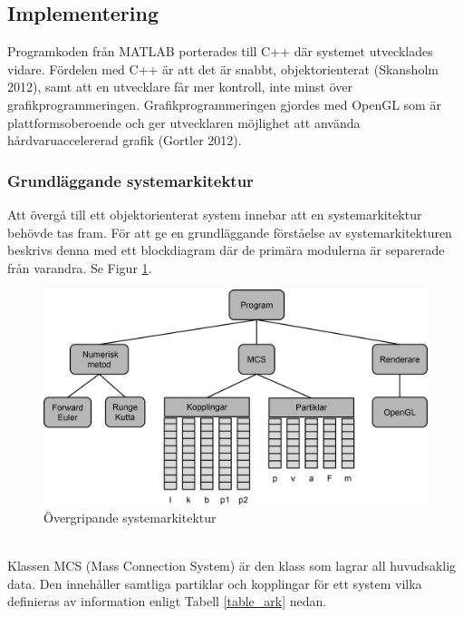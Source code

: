 \documentclass[a4paper,12pt,oneside,final,swedish]{extarticle}
\begin{document}
\subsection{Implementering}
Programkoden från MATLAB porterades till C++ där systemet utvecklades vidare. Fördelen med C++ är att det är snabbt, objektorienterat (Skansholm 2012), samt att en utvecklare får mer kontroll, inte minst över grafikprogrammeringen. Grafikprogrammeringen gjordes med OpenGL som är plattformsoberoende och ger utvecklaren möjlighet att använda hårdvaruaccelererad grafik (Gortler 2012).
\subsubsection{Grundläggande systemarkitektur}
Att övergå till ett objektorienterat system innebar att en systemarkitektur behövde tas fram. 
För att ge en grundläggande förståelse av systemarkitekturen beskrivs denna med ett blockdiagram där de primära modulerna är separerade från varandra. 
Se Figur \ref{systemark::nonfloat}.
\begin{figure}[h!]
  \begin{center}
    \includegraphics[width=16cm]{Bilder/Arkitektur.png} 
  \end{center}
  \caption{Övergripande systemarkitektur}
  \label{systemark::nonfloat}
\end{figure}
\\Klassen MCS (Mass Connection System) är den klass som lagrar all huvudsaklig data. Den innehåller samtliga partiklar och kopplingar för ett system vilka definieras av information enligt Tabell \ref{table_ark} nedan.
\\
\end{document}
